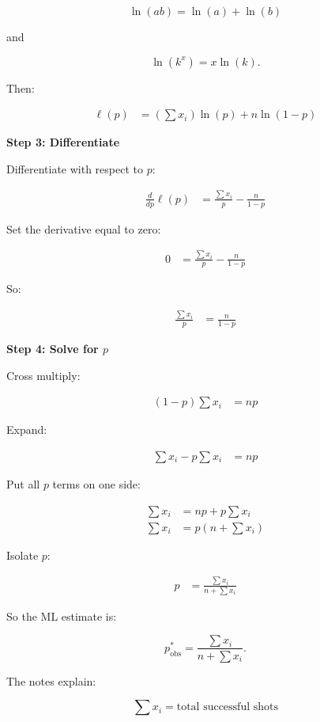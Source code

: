 \documentclass[10pt]{article}
\begin{document}
\[
\ln(ab)=\ln(a)+\ln(b)
\]

and

\[
\ln(k^x)=x\ln(k).
\]

Then:

\begin{align*}
\ell(p)
&=
\left(\sum x_i\right)\ln(p)
+n\ln(1-p)
\end{align*}

\textbf{Step 3: Differentiate}

Differentiate with respect to $p$:

\begin{align*}
\frac{d}{dp}\ell(p)
&=
\frac{\sum x_i}{p}
-\frac{n}{1-p}
\end{align*}

Set the derivative equal to zero:

\begin{align*}
0
&=
\frac{\sum x_i}{p}
-\frac{n}{1-p}
\end{align*}

So:

\begin{align*}
\frac{\sum x_i}{p}
&=
\frac{n}{1-p}
\end{align*}

\textbf{Step 4: Solve for $p$}

Cross multiply:

\begin{align*}
(1-p)\sum x_i
&=
np
\end{align*}

Expand:

\begin{align*}
\sum x_i
-p\sum x_i
&=
np
\end{align*}

Put all $p$ terms on one side:

\begin{align*}
\sum x_i
&=
np+p\sum x_i \\[2mm]
\sum x_i
&=
p\left(n+\sum x_i\right)
\end{align*}

Isolate $p$:

\begin{align*}
p
&=
\frac{\sum x_i}
{n+\sum x_i}
\end{align*}

So the ML estimate is:

\[
p^*_{\mathrm{obs}}
=
\frac{\sum x_i}
{n+\sum x_i}.
\]

The notes explain:

\[
\sum x_i
= \text{total successful shots}
\]
\end{document}
